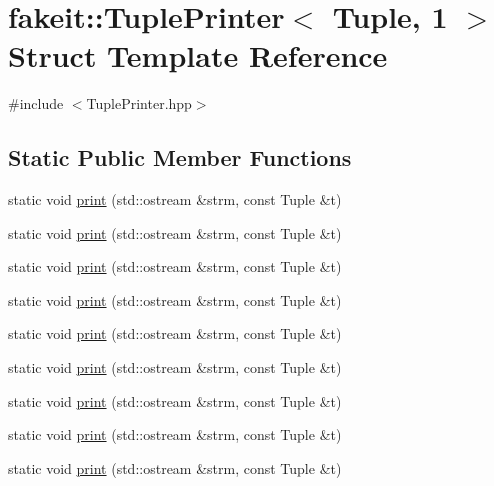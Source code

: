 \hypertarget{structfakeit_1_1TuplePrinter_3_01Tuple_00_011_01_4}{}\section{fakeit\+::Tuple\+Printer$<$ Tuple, 1 $>$ Struct Template Reference}
\label{structfakeit_1_1TuplePrinter_3_01Tuple_00_011_01_4}


{\ttfamily \#include $<$Tuple\+Printer.\+hpp$>$}

\subsection*{Static Public Member Functions}
\begin{DoxyCompactItemize}
\item 
static void \mbox{\hyperlink{structfakeit_1_1TuplePrinter_3_01Tuple_00_011_01_4_adf9fadff296532b4a997e6d76dae23bb}{print}} (std\+::ostream \&strm, const Tuple \&t)
\item 
static void \mbox{\hyperlink{structfakeit_1_1TuplePrinter_3_01Tuple_00_011_01_4_adf9fadff296532b4a997e6d76dae23bb}{print}} (std\+::ostream \&strm, const Tuple \&t)
\item 
static void \mbox{\hyperlink{structfakeit_1_1TuplePrinter_3_01Tuple_00_011_01_4_adf9fadff296532b4a997e6d76dae23bb}{print}} (std\+::ostream \&strm, const Tuple \&t)
\item 
static void \mbox{\hyperlink{structfakeit_1_1TuplePrinter_3_01Tuple_00_011_01_4_adf9fadff296532b4a997e6d76dae23bb}{print}} (std\+::ostream \&strm, const Tuple \&t)
\item 
static void \mbox{\hyperlink{structfakeit_1_1TuplePrinter_3_01Tuple_00_011_01_4_adf9fadff296532b4a997e6d76dae23bb}{print}} (std\+::ostream \&strm, const Tuple \&t)
\item 
static void \mbox{\hyperlink{structfakeit_1_1TuplePrinter_3_01Tuple_00_011_01_4_adf9fadff296532b4a997e6d76dae23bb}{print}} (std\+::ostream \&strm, const Tuple \&t)
\item 
static void \mbox{\hyperlink{structfakeit_1_1TuplePrinter_3_01Tuple_00_011_01_4_adf9fadff296532b4a997e6d76dae23bb}{print}} (std\+::ostream \&strm, const Tuple \&t)
\item 
static void \mbox{\hyperlink{structfakeit_1_1TuplePrinter_3_01Tuple_00_011_01_4_adf9fadff296532b4a997e6d76dae23bb}{print}} (std\+::ostream \&strm, const Tuple \&t)
\item 
static void \mbox{\hyperlink{structfakeit_1_1TuplePrinter_3_01Tuple_00_011_01_4_adf9fadff296532b4a997e6d76dae23bb}{print}} (std\+::ostream \&strm, const Tuple \&t)
\end{DoxyCompactItemize}


